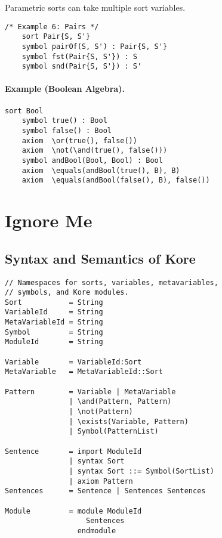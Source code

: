 \documentclass[UTF8,11pt]{article}
\theoremstyle{plain}
\theoremstyle{definition}
\theoremstyle{remark}
\begin{document}
Parametric sorts can take multiple sort variables.
\begin{Verbatim}[fontsize=\small]
    /* Example 6: Pairs */
    sort Pair{S, S'}
    symbol pairOf(S, S') : Pair{S, S'}
    symbol fst(Pair{S, S'}) : S
    symbol snd(Pair{S, S'}) : S'  
\end{Verbatim}

\paragraph{Example (Boolean Algebra).}
\begin{Verbatim}[fontsize=\small]
    sort Bool
    symbol true() : Bool
    symbol false() : Bool
    axiom  \or(true(), false())
    axiom  \not(\and(true(), false()))
    symbol andBool(Bool, Bool) : Bool
    axiom  \equals(andBool(true(), B), B)
    axiom  \equals(andBool(false(), B), false())
\end{Verbatim}



\section{Ignore Me}

\subsection{Syntax and Semantics of Kore}
\label{sec:syntax-of-kore}

\begin{Verbatim}[fontsize=\small]
// Namespaces for sorts, variables, metavariables,
// symbols, and Kore modules.
Sort           = String
VariableId     = String
MetaVariableId = String
Symbol         = String
ModuleId       = String

Variable       = VariableId:Sort
MetaVariable   = MetaVariableId::Sort

Pattern        = Variable | MetaVariable
               | \and(Pattern, Pattern)
               | \not(Pattern)
               | \exists(Variable, Pattern)
               | Symbol(PatternList)

Sentence       = import ModuleId
               | syntax Sort
               | syntax Sort ::= Symbol(SortList)
               | axiom Pattern
Sentences      = Sentence | Sentences Sentences

Module         = module ModuleId
                   Sentences
                 endmodule
\end{Verbatim}
\end{document}
